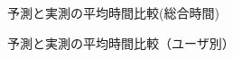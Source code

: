 \begin{figure}[ht]
	\begin{center}
		\caption{予測と実測の平均時間比較(総合時間)}
		\label{fig:compare2}
	\end{center}
\end{figure}

\begin{figure}[ht]
	\begin{center}
		\caption{予測と実測の平均時間比較（ユーザ別）}
		\label{fig:compare3}
	\end{center}
\end{figure}

